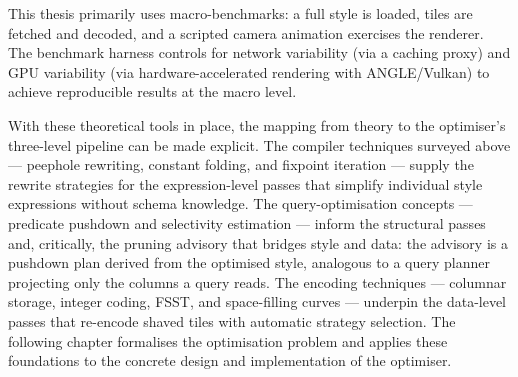 \noindent This thesis primarily uses macro-benchmarks: a full style is loaded, tiles are fetched and decoded, and a scripted camera animation exercises the renderer.
The benchmark harness controls for network variability (via a caching proxy) and GPU variability (via hardware-accelerated rendering with ANGLE/Vulkan) to achieve reproducible results at the macro level.

With these theoretical tools in place, the mapping from theory to the optimiser's three-level pipeline can be made explicit.
The compiler techniques surveyed above --- peephole rewriting, constant folding, and fixpoint iteration --- supply the rewrite strategies for the expression-level passes that simplify individual style expressions without schema knowledge.
The query-optimisation concepts --- predicate pushdown and selectivity estimation --- inform the structural passes and, critically, the pruning advisory that bridges style and data: the advisory is a pushdown plan derived from the optimised style, analogous to a query planner projecting only the columns a query reads.
The encoding techniques --- columnar storage, integer coding, \ac{FSST}, and space-filling curves --- underpin the data-level passes that re-encode shaved tiles with automatic strategy selection.
The following chapter formalises the optimisation problem and applies these foundations to the concrete design and implementation of the optimiser.
